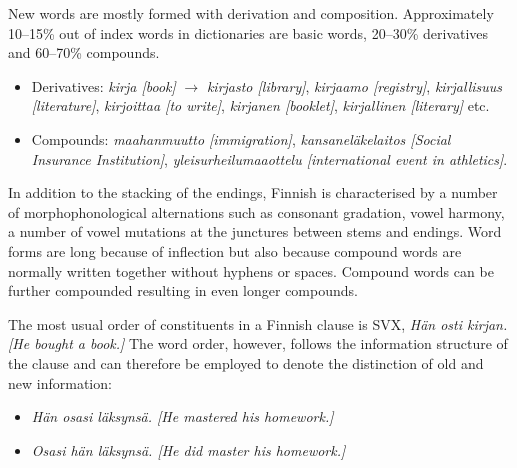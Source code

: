\begin{multicols}{2}
New words are mostly formed with derivation and composition.  Approximately 10–15\% out of index words in dictionaries are basic words, 20--30\% derivatives and 60–70\% compounds.

\begin{itemize}
\item Derivatives:
   \textit{\foreignlanguage{finnish}{\textit{kirja}} [book]} $\to$
   \textit{\foreignlanguage{finnish}{\textit{kirjasto}} [library]},
   \textit{\foreignlanguage{finnish}{\textit{kirjaamo}} [registry]},
   \textit{\foreignlanguage{finnish}{\textit{kirjallisuus}} [literature]},
   \textit{\foreignlanguage{finnish}{\textit{kirjoittaa}} [to write]},
   \textit{\foreignlanguage{finnish}{\textit{kirjanen}} [booklet]},
   \textit{\foreignlanguage{finnish}{\textit{kirjallinen}} [literary]} etc.

\item Compounds:
   \textit{\foreignlanguage{finnish}{\textit{maahanmuutto}} [immigration]},
   \textit{\foreignlanguage{finnish}{\textit{kansaneläkelaitos}}
           [Social Insurance Institution]},
   \textit{\foreignlanguage{finnish}{\textit{yleisurheilumaaottelu}}
           [international event in athletics]}.
\end{itemize}


In addition to the stacking of the endings, Finnish is characterised by a number of morphophonological alternations such as consonant gradation, vowel harmony, a number of vowel mutations at the junctures between stems and endings. Word forms are long because of inflection but also because compound words are normally written together without hyphens or spaces. Compound words can be further compounded resulting in even longer compounds.

The most usual order of constituents in a Finnish clause is SVX,
\textit{\foreignlanguage{finnish}{\textit{Hän osti kirjan.}}
        [He bought a book.]}
The word order, however, follows the
information structure of the clause and can therefore be employed to denote the
distinction of old and new information:

\begin{itemize}
\item \textit{\foreignlanguage{finnish}{\textit{Hän osasi läksynsä.}}
              [He mastered his homework.]}

\item \textit{\foreignlanguage{finnish}{\textit{Osasi hän läksynsä.}}
              [He did master his homework.]}
\end{itemize}


\end{multicols}
